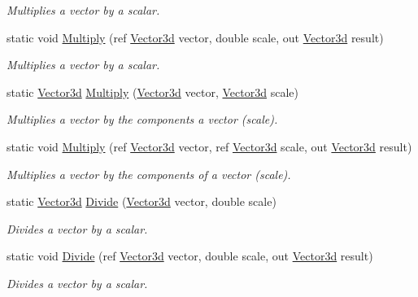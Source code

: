 \begin{DoxyCompactItemize}
\begin{DoxyCompactList}\small\item\em Multiplies a vector by a scalar. \end{DoxyCompactList}\item 
static void \hyperlink{struct_open_t_k_1_1_vector3d_a4308dccb089abe36ba817bda4ddd0633}{Multiply} (ref \hyperlink{struct_open_t_k_1_1_vector3d}{Vector3d} vector, double scale, out \hyperlink{struct_open_t_k_1_1_vector3d}{Vector3d} result)
\begin{DoxyCompactList}\small\item\em Multiplies a vector by a scalar. \end{DoxyCompactList}\item 
static \hyperlink{struct_open_t_k_1_1_vector3d}{Vector3d} \hyperlink{struct_open_t_k_1_1_vector3d_a7079a428810b58995b4a1865d9695d28}{Multiply} (\hyperlink{struct_open_t_k_1_1_vector3d}{Vector3d} vector, \hyperlink{struct_open_t_k_1_1_vector3d}{Vector3d} scale)
\begin{DoxyCompactList}\small\item\em Multiplies a vector by the components a vector (scale). \end{DoxyCompactList}\item 
static void \hyperlink{struct_open_t_k_1_1_vector3d_acd8421962a9e4ddf3b12f80368a750f5}{Multiply} (ref \hyperlink{struct_open_t_k_1_1_vector3d}{Vector3d} vector, ref \hyperlink{struct_open_t_k_1_1_vector3d}{Vector3d} scale, out \hyperlink{struct_open_t_k_1_1_vector3d}{Vector3d} result)
\begin{DoxyCompactList}\small\item\em Multiplies a vector by the components of a vector (scale). \end{DoxyCompactList}\item 
static \hyperlink{struct_open_t_k_1_1_vector3d}{Vector3d} \hyperlink{struct_open_t_k_1_1_vector3d_a41e2e84739b70b5302281ac799586760}{Divide} (\hyperlink{struct_open_t_k_1_1_vector3d}{Vector3d} vector, double scale)
\begin{DoxyCompactList}\small\item\em Divides a vector by a scalar. \end{DoxyCompactList}\item 
static void \hyperlink{struct_open_t_k_1_1_vector3d_a0639a0d73e3978bf9720ff7b1228b9a4}{Divide} (ref \hyperlink{struct_open_t_k_1_1_vector3d}{Vector3d} vector, double scale, out \hyperlink{struct_open_t_k_1_1_vector3d}{Vector3d} result)
\begin{DoxyCompactList}\small\item\em Divides a vector by a scalar. \end{DoxyCompactList}\item 

\end{DoxyCompactItemize}
